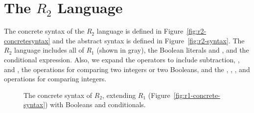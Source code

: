 \documentclass[11pt]{book}
\newcommand{\gray}[1]{{\color{lightgray} #1}}
\begin{document}
\section{The $R_2$ Language}
\label{sec:r2-lang}

The concrete syntax of the $R_2$ language is defined in
Figure~\ref{fig:r2-concretesyntax} and the abstract syntax is defined
in Figure~\ref{fig:r2-syntax}. The $R_2$ language includes all of
$R_1$ (shown in gray), the Boolean literals  and ,
and the conditional  expression. Also, we expand the
operators to include subtraction, ,  and ,
the   operations for comparing two integers or two Booleans,
and the \key{<}, \key{<=}, \key{>}, and \key{>=} operations for
comparing integers.

\begin{figure}[tp]
\centering
\fbox{
\begin{minipage}{0.96\textwidth}
\[
\begin{array}{lcl}
  \itm{cmp} &::= & \key{eq?} \mid \key{<} \mid \key{<=} \mid \key{>} \mid \key{>=} \\
  \Exp &::=& \gray{\Int \mid (\key{read}) \mid (\key{-}\;\Exp) \mid (\key{+} \; \Exp\;\Exp)}  \mid (\key{-}\;\Exp\;\Exp) \\
     &\mid&  \gray{\Var \mid \LET{\Var}{\Exp}{\Exp}} \\
     &\mid& \key{\#t} \mid \key{\#f} 
      \mid (\key{and}\;\Exp\;\Exp) \mid (\key{or}\;\Exp\;\Exp)
      \mid (\key{not}\;\Exp) \\
      &\mid& (\itm{cmp}\;\Exp\;\Exp) \mid (\key{if}~\Exp~\Exp~\Exp) \\
  R_2 &::=& \Exp
\end{array}
\]
\end{minipage}
}
\caption{The concrete syntax of $R_2$, extending $R_1$
  (Figure~\ref{fig:r1-concrete-syntax}) with Booleans and conditionals.}
\label{fig:r2-concrete-syntax}
\end{figure}
\end{document}
